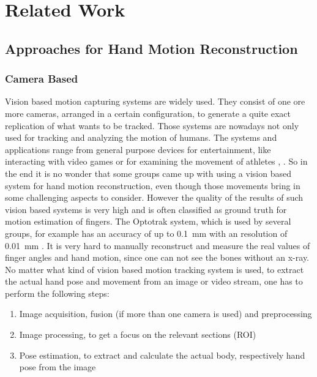 
\lhead[\chaptername~\thechapter]{\rightmark}

\rhead[\leftmark]{}

\lfoot[\thepage]{}

\cfoot{}

\rfoot[]{\thepage}


\chapter{Related Work}
\label{cha:relatedWork}


\section{Approaches for Hand Motion Reconstruction} \label{sec:approaches}


\subsection{Camera Based} \label{subsec:approaches:vision}
Vision based motion capturing systems are widely used. They consist of one ore more cameras, arranged in a certain configuration, to generate a quite exact replication of what wants to be tracked. Those systems are nowadays not only used for tracking and analyzing the motion of humans. The systems and applications range from general purpose devices for entertainment, like interacting with video games or for examining the movement of athletes \cite{zhang2012microsoft}, \cite{boyd2012situ}. So in the end it is no wonder that some groups came up with using a vision based system for hand motion reconstruction, even though those movements bring in some challenging aspects to consider. However the quality of the results of such vision based systems is very high and is often classified as ground truth for motion estimation of fingers. The Optotrak system, which is used by several groups, for example has an accuracy of up to \SI{0.1}{\mm} with an resolution of \SI{0.01}{\mm} \cite{optotrak}. It is very hard to manually reconstruct and measure the real values of finger angles and hand motion, since one can not see the bones without an x-ray. \\
No matter what kind of vision based motion tracking system is used, to extract the actual hand pose and movement from an image or video stream, one has to perform the following steps:
\begin{enumerate}
\item Image acquisition, fusion (if more than one camera is used) and preprocessing
\item Image processing, to get a focus on the relevant sections (\ac{ROI}) 
\item Pose estimation, to extract and calculate the actual body, respectively hand pose from the image
\end{enumerate}
